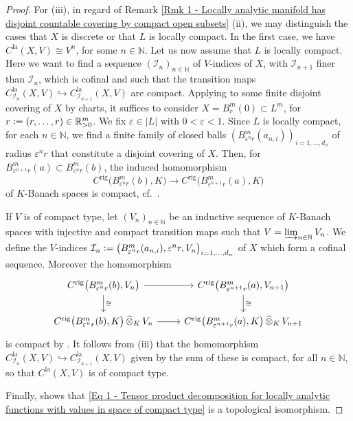 \documentclass[a4paper, reqno, 10pt]{amsart}
\theoremstyle{definition}
\numberwithin{equation}{section}
\newcommand{\abs}[1]{{\lvert{#1}\rvert}}
\newcommand{\cotimes}[1]{{\,\widehat{\otimes}_{#1}\,}}
\newcommand{\defeq}{\vcentcolon=}
\newcommand{\la}{{\mathrm{la}}}
\newcommand{\lra}{\longrightarrow}
\newcommand{\BN}{{\mathbb {N}}}
\newcommand{\BR}{{\mathbb {R}}}
\newcommand{\CI}{{\mathcal {I}}}
\newcommand{\aan}{{\mathrm{rig}}}
\begin{document}
\begin{proof}
	
	
	For (iii), in regard of Remark \ref{Rmk 1 - Locally analytic manifold has disjoint countable covering by compact open subsets} (ii), we may distinguish the cases that $X$ is discrete or that $L$ is locally compact.
	In the first case, we have $C^\la(X,V) \cong V^n$, for some $n\in \BN$.
	Let us now assume that $L$ is locally compact.
	Here we want to find a sequence $(\CI_n)_{n\in \BN}$ of $V$-indices of $X$, with $\CI_{n+1}$ finer than $\CI_n$, which is cofinal and such that the transition maps $C^\la_{\CI_n}(X,V) \hookrightarrow C^\la_{\CI_{n+1}}(X,V)$ are compact.
	Applying  to some finite disjoint covering of $X$ by charts, it suffices to consider $X=B_{r}^{m}(0)\subset L^m$, for $r \defeq (r,\ldots,r) \in \BR_{>0}^m$.
	We fix $\varepsilon \in \abs{L}$ with $0<\varepsilon <1$.
	Since $L$ is locally compact, for each $n\in \BN$, we find a finite family of closed balls $(B^{m}_{\varepsilon^n r}(a_{n,i}))_{i=1,\ldots,d_n}$ of radius $\varepsilon^n r$ that constitute a disjoint covering of $X$.
	Then, for $B_{\varepsilon^{n+1} r}^{m}(a)  \subset B_{\varepsilon^{n} r}^{m}(b)$, the induced homomorphism
	\begin{equation*}
		C^\aan \big(B_{\varepsilon^{n} r}^{m}(b), K \big) \lra C^\aan \big(B_{\varepsilon^{n+1} r}^{m}(a), K \big)
	\end{equation*}
	of $K$-Banach spaces is compact, cf.\ \cite[\S 16 Claim, p.\ 98]{Schneider02NonArchFunctAna}.
	
	
	If $V$ is of compact type, let $(V_n)_{n\in \BN}$ be an inductive sequence of $K$-Banach spaces with injective and compact transition maps such that $V=  \varinjlim_{n\in \BN} V_n$.
	We define the $V$-indices $\CI_n \defeq \big(B^{m}_{\varepsilon^n r}(a_{n,i}), \varepsilon^n r, V_n \big)_{i=1,\ldots,d_n}$ of $X$ which form a cofinal sequence.
	Moreover the homomorphism
	\begin{equation*}
		\begin{tikzcd}
			C^\aan \big(B_{\varepsilon^{n} r}^{m}(b), V_n \big) \ar[r] \ar[d, "\cong"] &C^\aan \big(B_{\varepsilon^{n+1} r}^{m}(a), V_{n+1} \big) \ar[d, "\cong"] \\
			C^\aan \big(B_{\varepsilon^{n} r}^{m}(b) , K \big) \cotimes{K} V_n \ar[r] &C^\aan \big(B_{\varepsilon^{n+1} r}^{m}(a), K \big) \cotimes{K} V_{n+1}
		\end{tikzcd}
	\end{equation*}
	is compact by \cite[Lemma 18.12]{Schneider02NonArchFunctAna}.
	It follows from  (iii) that the homomorphism $C^\la_{\CI_n} (X,V) \hookrightarrow C^\la_{\CI_{n+1}}(X,V)$ given by the sum of these is compact, for all $n\in \BN$, so that $C^\la(X,V)$ is of compact type.
	
	
	Finally, \cite[Prop.\ 1.1.32 (i)]{Emerton17LocAnVect} shows that \eqref{Eq 1 - Tensor product decomposition for locally analytic functions with values in space of compact type} is a topological isomorphism.
\end{proof}
\end{document}
